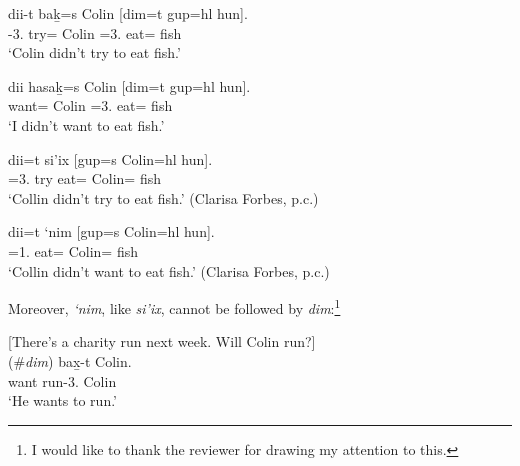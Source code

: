 \documentclass[output=paper]{langscibook}
\begin{document}
\begin{exe}
\ex \label{Todoro46}
\begin{xlist}

\ex \label{Todoro46a}
 {dii-t} 	   {bak̲=}s	{Colin}	[{dim=t}	        {gup=hl} 	{hun}]. \\
    	-3.{\seriesI}  try={\pn} 	Colin 	 =3.{\seriesI}   eat=	 fish\\
\glt `Colin didn’t try to eat fish.' 

\ex \label{Todoro46b}
 	{dii} 	   {hasak̲=s} 	{Colin}	[{dim=t}	        {gup=hl} 	{hun}]. \\
    	 	   want={\pn}	Colin 	 =3.{\seriesI}   eat=	 fish\\
\glt ‘I didn’t want to eat fish.' 

\end{xlist}

\ex \label{Todoro47}
\begin{xlist}

\ex \label{Todoro47a}
 	{dii=t} 		{si’ix} 	[{gup=s} 	{Colin=hl}	{hun}]. \\
     	=3.{\seriesI} 	try 	eat={\pn} 	Colin= 	fish\\
\glt ‘Collin didn’t try to eat fish.’ (Clarisa Forbes, p.c.) 

\ex \label{Todoro47b}
 	{dii=t} 	   {‘nim} 	[{gup=s} 	{Colin=hl}	{hun}].\\
     	=1.{\seriesI}  	eat={\pn}	Colin= 	fish\\
\glt `Collin didn’t want to eat fish.’               (Clarisa Forbes, p.c.) 

\end{xlist}
\end{exe}

Moreover, \emph{‘nim}, like \emph{si’ix}, cannot be followed by \emph{dim}:\footnote{I would like to thank the reviewer for drawing my attention to this.}  

\begin{exe}
\ex \label{Todoro48}
[There’s a charity run next week. Will Colin run?] \\
	  (\#{\textit{dim}})	{bax̱-t}          {Colin}.\\ 
want	   	run-3.{\seriesII} 	Colin\\
\glt ‘He wants to run.’	
\end{exe}
\end{document}
